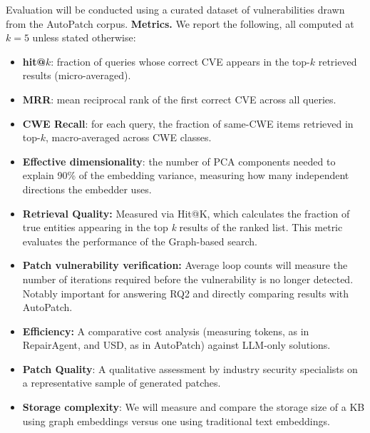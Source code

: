 \documentclass[11pt, a4paper]{article}
\begin{document}
Evaluation will be conducted using a curated dataset of vulnerabilities drawn from the AutoPatch corpus.
  \textbf{Metrics.}
  We report the following, all computed at $k{=}5$ unless stated otherwise:
  \begin{itemize}[nosep]
    \item \textbf{hit@$k$}: fraction of queries whose correct CVE
      appears in the top-$k$ retrieved results (micro-averaged).
    \item \textbf{MRR}: mean reciprocal rank of the first correct
      CVE across all queries.
    \item \textbf{CWE Recall}: for each query, the fraction of
      same-CWE items retrieved in top-$k$, macro-averaged across
      CWE classes.
    \item \textbf{Effective dimensionality}: the number of PCA
      components needed to explain 90\% of the embedding variance,
      measuring how many independent directions the embedder uses.
  \end{itemize}

\begin{itemize}
\item \textbf{Retrieval Quality:} Measured via Hit@K, which calculates the fraction of true entities appearing in the top \textit{k} results of the ranked list. This metric evaluates the performance of the Graph-based search. %
\item \textbf{Patch vulnerability verification:} Average loop counts will measure the number of iterations required before the vulnerability is no longer detected. Notably important for answering RQ2 and directly comparing results with AutoPatch.
\item \textbf{Efficiency:} A comparative cost analysis (measuring tokens, as in RepairAgent, and USD, as in AutoPatch) against LLM-only solutions.
\item \textbf{Patch Quality}: A qualitative assessment by industry security specialists on a representative sample of generated patches.
\item \textbf{Storage complexity}: We will measure and compare the storage size of a KB using graph embeddings versus one using traditional text embeddings.
\end{itemize}
\end{document}
